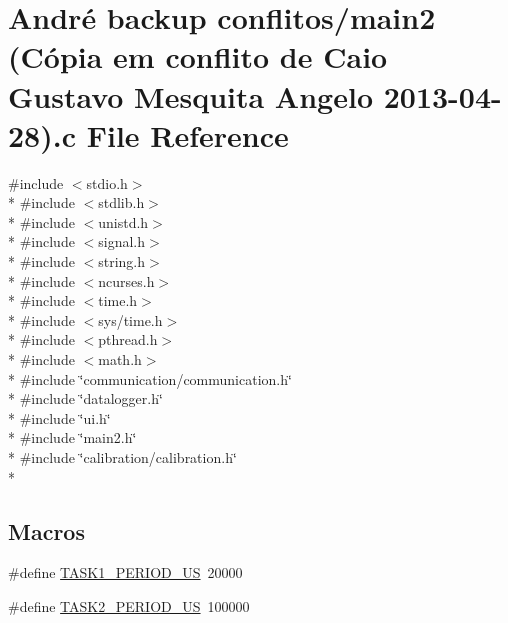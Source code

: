 \hypertarget{main2_01_07C_xC3_xB3pia_01em_01conflito_01de_01Caio_01Gustavo_01Mesquita_01Angelo_012013-04-28_08_8c}{\section{André backup conflitos/main2 (Cópia em conflito de Caio Gustavo Mesquita Angelo 2013-\/04-\/28).c File Reference}
\label{main2_01_07C_xC3_xB3pia_01em_01conflito_01de_01Caio_01Gustavo_01Mesquita_01Angelo_012013-04-28_08_8c}
}
{\ttfamily \#include $<$stdio.\-h$>$}\\*
{\ttfamily \#include $<$stdlib.\-h$>$}\\*
{\ttfamily \#include $<$unistd.\-h$>$}\\*
{\ttfamily \#include $<$signal.\-h$>$}\\*
{\ttfamily \#include $<$string.\-h$>$}\\*
{\ttfamily \#include $<$ncurses.\-h$>$}\\*
{\ttfamily \#include $<$time.\-h$>$}\\*
{\ttfamily \#include $<$sys/time.\-h$>$}\\*
{\ttfamily \#include $<$pthread.\-h$>$}\\*
{\ttfamily \#include $<$math.\-h$>$}\\*
{\ttfamily \#include \char`\"{}communication/communication.\-h\char`\"{}}\\*
{\ttfamily \#include \char`\"{}datalogger.\-h\char`\"{}}\\*
{\ttfamily \#include \char`\"{}ui.\-h\char`\"{}}\\*
{\ttfamily \#include \char`\"{}main2.\-h\char`\"{}}\\*
{\ttfamily \#include \char`\"{}calibration/calibration.\-h\char`\"{}}\\*
\subsection*{Macros}
\begin{DoxyCompactItemize}
\item 
\#define \hyperlink{main2_01_07C_xC3_xB3pia_01em_01conflito_01de_01Caio_01Gustavo_01Mesquita_01Angelo_012013-04-28_08_8c_a95fe7f7d25a81aabd1194bac017074d8}{T\-A\-S\-K1\-\_\-\-P\-E\-R\-I\-O\-D\-\_\-\-U\-S}~20000
\item 
\#define \hyperlink{main2_01_07C_xC3_xB3pia_01em_01conflito_01de_01Caio_01Gustavo_01Mesquita_01Angelo_012013-04-28_08_8c_adfe9b03db41d576a3beb124ec44a54d8}{T\-A\-S\-K2\-\_\-\-P\-E\-R\-I\-O\-D\-\_\-\-U\-S}~100000
\end{DoxyCompactItemize}
